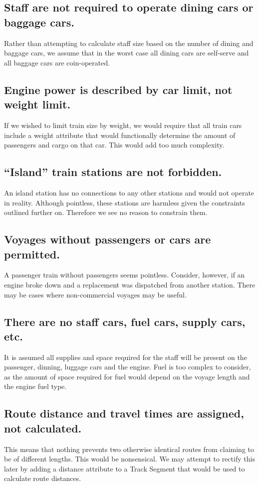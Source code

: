 \documentclass[a4paper]{article}
\begin{document}
\subsection*{Staff are not required to operate dining cars or baggage cars.}
	Rather than attempting to calculate staff size based on the number of dining and baggage cars, we assume that in the worst case all dining cars are self-serve and all baggage cars are coin-operated.
    
\subsection*{Engine power is described by car limit, not weight limit.}
If we wished to limit train size by weight, we would require that all train cars include a weight attribute that would functionally determine the amount of passengers and cargo on that car. This would add too much complexity.

\subsection*{“Island” train stations are not forbidden.}
	An island station has no connections to any other stations and would not operate in reality. Although pointless, these stations are harmless given the constraints outlined further on. Therefore we see no reason to constrain them.
    
\subsection*{Voyages without passengers or cars are permitted.}
	A passenger train without passengers seems pointless. Consider, however, if an engine broke down and a replacement was dispatched from another station. There may be cases where non-commercial voyages may be useful. 
    
\subsection*{There are no staff cars, fuel cars, supply cars, etc.}
It is assumed all supplies and space required for the staff will be present on the passenger, dinning, luggage cars and the engine. Fuel is too complex to consider, as the amount of space required for fuel would depend on the voyage length and the engine fuel type. 

\subsection*{Route distance and travel times are assigned, not calculated.}
This means that nothing prevents two otherwise identical routes from claiming to be of different lengths. This would be nonsensical. We may attempt to rectify this later by adding a distance attribute to a Track Segment that would be used to calculate route distances.
\end{document}
